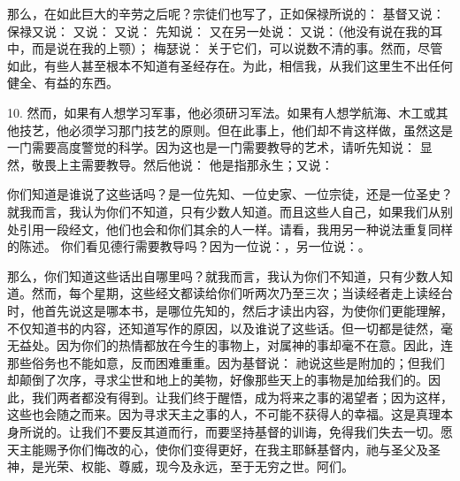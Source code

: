 那么，在如此巨大的辛劳之后呢？宗徒们也写了，正如保禄所说的： 基督又说： 保禄又说： 又说： 又说： 先知说： 又在另一处说： 又说：（他没有说在我的耳中，而是说在我的上颚）； 梅瑟说：  关于它们，可以说数不清的事。然而，尽管如此，有些人甚至根本不知道有圣经存在。为此，相信我，从我们这里生不出任何健全、有益的东西。\par

10. 然而，如果有人想学习军事，他必须研习军法。如果有人想学航海、木工或其他技艺，他必须学习那门技艺的原则。但在此事上，他们却不肯这样做，虽然这是一门需要高度警觉的科学。因为这也是一门需要教导的艺术，请听先知说： 显然，敬畏上主需要教导。然后他说： 他是指那永生；又说：\par

你们知道是谁说了这些话吗？是一位先知、一位史家、一位宗徒，还是一位圣史？就我而言，我认为你们不知道，只有少数人知道。而且这些人自己，如果我们从别处引用一段经文，他们也会和你们其余的人一样。请看，我用另一种说法重复同样的陈述。 你们看见德行需要教导吗？因为一位说：，另一位说：。\par

那么，你们知道这些话出自哪里吗？就我而言，我认为你们不知道，只有少数人知道。然而，每个星期，这些经文都读给你们听两次乃至三次；当读经者走上读经台时，他首先说这是哪本书，是哪位先知的，然后才读出内容，为使你们更能理解，不仅知道书的内容，还知道写作的原因，以及谁说了这些话。但一切都是徒然，毫无益处。因为你们的热情都放在今生的事物上，对属神的事却毫不在意。因此，连那些俗务也不能如意，反而困难重重。因为基督说： 祂说这些是附加的；但我们却颠倒了次序，寻求尘世和地上的美物，好像那些天上的事物是加给我们的。因此，我们两者都没有得到。让我们终于醒悟，成为将来之事的渴望者；因为这样，这些也会随之而来。因为寻求天主之事的人，不可能不获得人的幸福。这是真理本身所说的。让我们不要反其道而行，而要坚持基督的训诲，免得我们失去一切。愿天主能赐予你们悔改的心，使你们变得更好，在我主耶稣基督内，祂与圣父及圣神，是光荣、权能、尊威，现今及永远，至于无穷之世。阿们。\par

